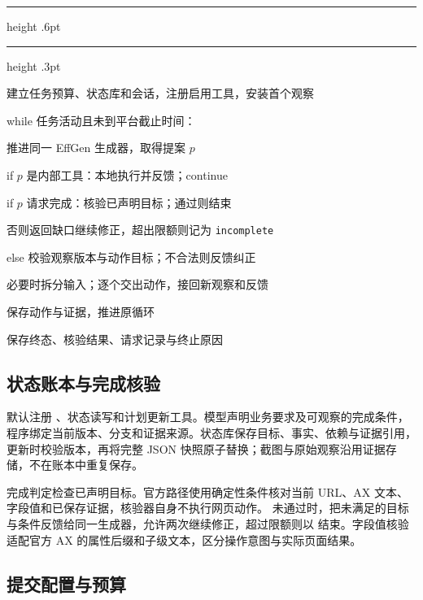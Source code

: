 \documentclass[UTF8,zihao=5,fontset=windows,a4paper]{ctexart}
\newcommand{\kw}[1]{\textsf{\color{navy}#1}}
\newcommand{\algline}[2]{\makebox[1.4em][r]{\scriptsize\color{muted}#1}\hspace{0.7em}#2\par}
\begin{document}
\begin{algorithm}[htbp]
{\color{blue}\hrule height .6pt}
\caption{最终官方入口的连续执行流程}\label{alg:loop}
{\color{rulegray}\hrule height .3pt}
\vspace{6pt}
\begingroup
\small\setlength{\parindent}{0pt}\setlength{\parskip}{3pt}
\algline{1}{建立任务预算、状态库和会话，注册启用工具，安装首个观察}
\algline{2}{\kw{while} 任务活动且未到平台截止时间：}
\algline{3}{\hspace*{1.3em}推进同一 EffGen 生成器，取得提案 $p$}
\algline{4}{\hspace*{1.3em}\kw{if} $p$ 是内部工具：本地执行并反馈；\kw{continue}}
\algline{5}{\hspace*{1.3em}\kw{if} $p$ 请求完成：核验已声明目标；通过则结束}
\algline{6}{\hspace*{2.6em}否则返回缺口继续修正，超出限额则记为 \texttt{incomplete}}
\algline{7}{\hspace*{1.3em}\kw{else} 校验观察版本与动作目标；不合法则反馈纠正}
\algline{8}{\hspace*{2.6em}必要时拆分输入；逐个交出动作，接回新观察和反馈}
\algline{9}{\hspace*{2.6em}保存动作与证据，推进原循环}
\algline{10}{保存终态、核验结果、请求记录与终止原因}
\endgroup
\vspace{2pt}
\noindent{\color{rulegray}\rule{\linewidth}{.4pt}}
\end{algorithm}


\subsection{状态账本与完成核验}

默认注册 、状态读写和计划更新工具。模型声明业务要求及可观察的完成条件，程序绑定当前版本、分支和证据来源。状态库保存目标、事实、依赖与证据引用，更新时校验版本，再将完整 JSON 快照原子替换；截图与原始观察沿用证据存储，不在账本中重复保存。

完成判定检查已声明目标。官方路径使用确定性条件核对当前 URL、AX 文本、字段值和已保存证据，核验器自身不执行网页动作。 未通过时，把未满足的目标与条件反馈给同一生成器，允许两次继续修正，超过限额则以  结束。字段值核验适配官方 AX 的属性后缀和子级文本，区分操作意图与实际页面结果。

\subsection{提交配置与预算}
\end{document}
